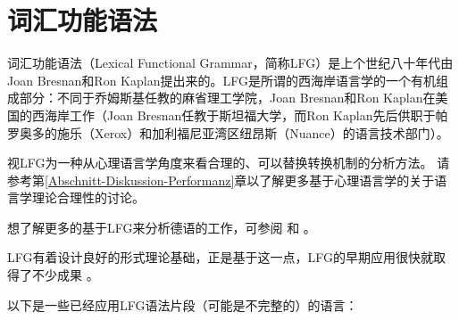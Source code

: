 
\chapter{词汇功能语法}
\label{Kapitel-LFG}

词汇功能语法（Lexical Functional Grammar，简称LFG）是上个世纪八十年代由Joan Bresnan和Ron Kaplan提出来的\citep{BK82a}。LFG是所谓的西海岸语言学的一个有机组成部分：不同于乔姆斯基任教的麻省理工学院，Joan Bresnan和Ron Kaplan在美国的西海岸工作（Joan Bresnan任教于斯坦福大学，而Ron Kaplan先后供职于帕罗奥多的施乐（Xerox）和加利福尼亚湾区纽昂斯（Nuance）的语言技术部门）。

 \citet{BK82a}视LFG为一种从心理语言学角度来看合理的、可以替换转换机制的分析方法。
请参考第\ref{Abschnitt-Diskussion-Performanz}章以了解更多基于心理语言学的关于语言学理论合理性的讨论。 

想了解更多的基于LFG来分析德语的工作，可参阅 和 。

LFG有着设计良好的形式理论基础\citep{KB82a-u,Kaplan95a}，正是基于这一点，LFG的早期应用很快就取得了不少成果
\citep*{FR83b,FR83a,Yasukawa1984a-u,BH86a-u,%
ED86a-u,%
WA86a-u,%
Delmonte90a-u,%
HHP91a-u,%
Kohl92a-u,KGPRM92a-u,%
KM96a-u,%
Mayo97a-u,Mayo99a-u,%
BS2005b-u,BSagot2005a-u,%
Clement2009a-u,CK2001a-u%
}。

以下是一些已经应用LFG语法片段（可能是不完整的）的语言：


